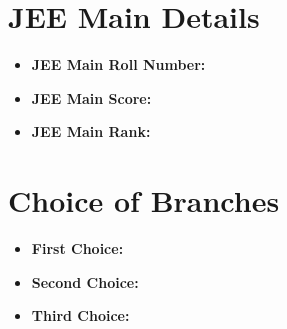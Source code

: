 \documentclass{article}
\begin{document}
\section*{JEE Main Details}
\begin{itemize}[leftmargin=*, label={}, itemsep=5pt]
    \item \textbf{JEE Main Roll Number:} \underline{\hspace{8cm}}
    \item \textbf{JEE Main Score:} \underline{\hspace{8cm}}
    \item \textbf{JEE Main Rank:} \underline{\hspace{8cm}}
\end{itemize}

\section*{Choice of Branches}
\begin{itemize}[leftmargin=*, label={}, itemsep=5pt]
    \item \textbf{First Choice:} \underline{\hspace{8cm}}
    \item \textbf{Second Choice:} \underline{\hspace{8cm}}
    \item \textbf{Third Choice:} \underline{\hspace{8cm}}
\end{itemize}
\end{document}
